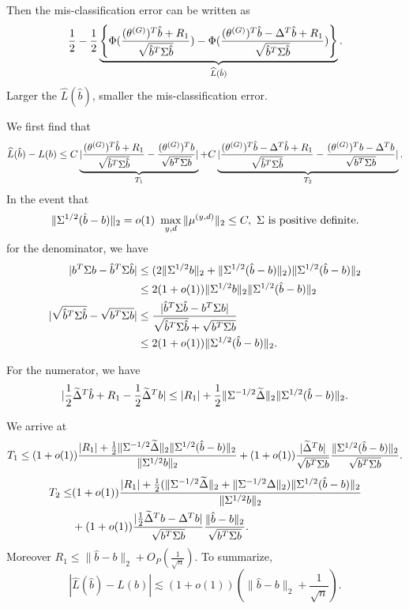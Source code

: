Then the mis-classification error can be written as
\begin{align}
\label{loss2}
    \frac{1}{2}-\frac{1}{2}\underbrace{\left\{\Phi(\frac{(\theta^{(G)})^T\hat{b}+R_1}{\sqrt{\hat{b}^T\Sigma \hat{b}}})-\Phi(\frac{(\theta^{(G)})^T\hat{b}-\Delta^T\hat{b}+R_1}{\sqrt{\hat{b}^T\Sigma \hat{b}}})\right\}}_{\widehat{L}(\hat{b})}.
\end{align}
Larger the $\widehat{L}(\hat{b})$, smaller the mis-classification error.

We first find that
\begin{align*}
    \widehat{L}(\hat{b})-L(b)\leq C\underbrace{|\frac{(\theta^{(G)})^T\hat{b}+R_1}{\sqrt{\hat{b}^T\Sigma \hat{b}}}-\frac{(\theta^{(G)})^Tb}{\sqrt{b^T\Sigma b}}|}_{T_1}+C\underbrace{|\frac{(\theta^{(G)})^T\hat{b}-\Delta^T\hat{b}+R_1}{\sqrt{\hat{b}^T\Sigma \hat{b}}}-\frac{(\theta^{(G)})^Tb-\Delta^Tb}{\sqrt{b^T\Sigma b}}|}_{T_2}.
\end{align*}
In the event that
\[
   \|\Sigma^{1/2}(\hat{b}-b)\|_2=o(1) ~\max_{y,d}\|\mu^{(y,d)}\|_2\leq C,~\Sigma~\text{is positive definite.}
\]
for the denominator, we have
\begin{align*}
|b^T\Sigma b-\hat{b}^T\Sigma\hat{b}|&\leq (2\|\Sigma^{1/2} b\|_2+\|\Sigma^{1/2}(\hat{b}-b)\|_2)\|\Sigma^{1/2}(\hat{b}-b)\|_2\\
&\leq 2(1+o(1))\|\Sigma^{1/2} b\|_2\|\Sigma^{1/2}(\hat{b}-b)\|_2\\
  | \sqrt{\hat{b}^T\Sigma\hat{b}}-\sqrt{b^T\Sigma b}|&\leq \frac{|\hat{b}^T\Sigma\hat{b}-b^T\Sigma b|}{\sqrt{\hat{b}^T\Sigma\hat{b}}+\sqrt{b^T\Sigma b}}\\
  &\leq 2(1+o(1))\|\Sigma^{1/2}(\hat{b}-b)\|_2.
\end{align*}

For the numerator, we have
\[
|\frac{1}{2}\widetilde{\Delta}^T\hat{b}+R_1-\frac{1}{2}\widetilde{\Delta}^Tb|\leq |R_1|+\frac{1}{2}\|\Sigma^{-1/2}\widetilde{\Delta}\|_2\|\Sigma^{1/2}(\hat{b}-b)\|_2.
\]

We arrive at
\begin{align*}
    T_1\leq (1+o(1))\frac{|R_1|+\frac{1}{2}\|\Sigma^{-1/2}\widetilde{\Delta}\|_2\|\Sigma^{1/2}(\hat{b}-b)\|_2}{\|\Sigma^{1/2}b\|_2}+(1+o(1))\frac{|\widetilde{\Delta}^Tb|}{\sqrt{b^T\Sigma b}}\frac{\|\Sigma^{1/2}(\hat{b}-b)\|_2}{\sqrt{b^T\Sigma b}}.
\end{align*}
\begin{align*}
    T_2\leq& (1+o(1))\frac{|R_1|+\frac{1}{2}(\|\Sigma^{-1/2}\widetilde{\Delta}\|_2+\|\Sigma^{-1/2}\Delta\|_2)\|\Sigma^{1/2}(\hat{b}-b)\|_2}{\|\Sigma^{1/2}b\|_2}\\
    &+(1+o(1))\frac{|\frac{1}{2}\widetilde{\Delta}^Tb-\Delta^Tb|}{\sqrt{b^T\Sigma b}}\frac{\|\hat{b}-b\|_2}{\sqrt{b^T\Sigma b}}.
\end{align*}
Moreover $R_1\leq \|\hat{b}-b\|_2+O_P(\frac{1}{\sqrt{n}})$.
To summarize,
\[
 |\widehat{L}(\hat{b})-L(b)|\lesssim (1+o(1))(\|\hat{b}-b\|_2+\frac{1}{\sqrt{n}}).
\]


